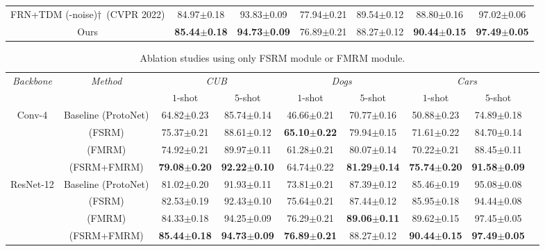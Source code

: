 \documentclass[letterpaper]{article} %
\begin{document}
\begin{table}[!ht]
\begin{tabular}{ccccccc}
FRN+TDM (-noise)$\dag$~(CVPR 2022)%
& 84.97$\pm$0.18
& 93.83$\pm$0.09
& 77.94$\pm$0.21
& 89.54$\pm$0.12
& 88.80$\pm$0.16
& 97.02$\pm$0.06  \\

Ours
& \textbf{85.44$\pm$0.18}
& \textbf{94.73$\pm$0.09}
& {76.89$\pm$0.21}
& 88.27$\pm$0.12
& \textbf{90.44$\pm$0.15}
& \textbf{97.49$\pm$0.05} \\ \bottomrule
\end{tabular}
\end{table}




\begin{table}[!htp]
\centering
\caption{Ablation studies using only FSRM module or FMRM module.}
\label{tab:3}
\begin{tabular}{ccccccccc}
\toprule[1pt]
  \multirow{2}{*}{\it{Backbone}}
&
\multirow{2}{*}{\it{Method}}
& \multicolumn{2}{c}{\it{CUB}}
& \multicolumn{2}{c}{\it{Dogs}}
& \multicolumn{2}{c}{\it{Cars}} \\

&
& \multicolumn{1}{c}{$1$-shot}
& \multicolumn{1}{c}{$5$-shot}
& \multicolumn{1}{c}{$1$-shot}
& \multicolumn{1}{c}{$5$-shot}
& \multicolumn{1}{c}{$1$-shot}
& \multicolumn{1}{c}{$5$-shot} \\ \midrule

\multirow{4}{*}{Conv-4}
&
Baseline (ProtoNet)
& 64.82$\pm$0.23
& 85.74$\pm$0.14
& 46.66$\pm$0.21
& 70.77$\pm$0.16
& 50.88$\pm$0.23
& 74.89$\pm$0.18 \\

&
(FSRM)
& 75.37$\pm$0.21
& 88.61$\pm$0.12
& \textbf{65.10$\pm$0.22}
& 79.94$\pm$0.15
& 71.61$\pm$0.22
& 84.70$\pm$0.14 \\

&
(FMRM)
& 74.92$\pm$0.21
& 89.97$\pm$0.11
& 61.28$\pm$0.21
& 80.07$\pm$0.14
& 70.22$\pm$0.21
& 88.45$\pm$0.11 \\

&
(FSRM+FMRM)
& \textbf{79.08$\pm$0.20}
& \textbf{92.22$\pm$0.10}
& 64.74$\pm$0.22
& \textbf{81.29$\pm$0.14}
& \textbf{75.74$\pm$0.20}
& \textbf{91.58$\pm$0.09} \\ \midrule


\multirow{4}{*}{ResNet-12}
&
Baseline (ProtoNet)
& 81.02$\pm$0.20
& 91.93$\pm$0.11
& 73.81$\pm$0.21
& 87.39$\pm$0.12
& 85.46$\pm$0.19
& 95.08$\pm$0.08 \\

&
(FSRM)
& 82.53$\pm$0.19
& 92.43$\pm$0.10
& 75.64$\pm$0.21
& 87.44$\pm$0.12
& 85.95$\pm$0.18
& 94.44$\pm$0.08 \\

&
(FMRM)
& 84.33$\pm$0.18
& 94.25$\pm$0.09
& 76.29$\pm$0.21
& \textbf{89.06$\pm$0.11}
& 89.62$\pm$0.15
& 97.45$\pm$0.05 \\

&
(FSRM+FMRM)
& \textbf{85.44$\pm$0.18}
& \textbf{94.73$\pm$0.09}
& \textbf{76.89$\pm$0.21}
& 88.27$\pm$0.12
& \textbf{90.44$\pm$0.15}
& \textbf{97.49$\pm$0.05}  \\ \bottomrule
\end{tabular}
\end{table}
\end{document}
